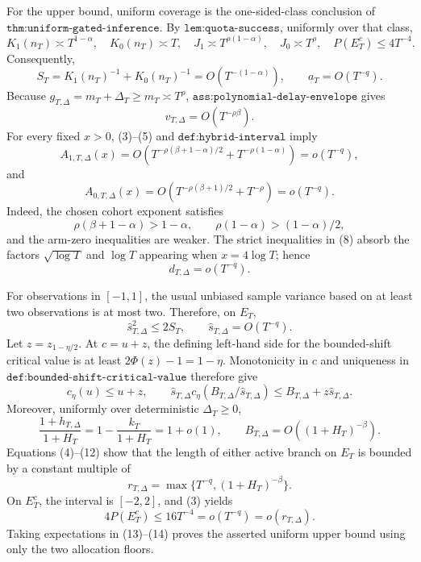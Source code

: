 For the upper bound, uniform coverage is the one-sided-class conclusion of \(\texttt{thm:uniform-gated-inference}\).  By \(\texttt{lem:quota-success}\), uniformly over that class,
\[
 K_1(n_T)\asymp T^{1-\alpha},\quad K_0(n_T)\asymp T,
 \quad J_1\asymp T^{\rho(1-\alpha)},\quad J_0\asymp T^\rho,
 \quad P(E_T^c)\leq4T^{-4}.
 \tag{3}
\]
Consequently,
\[
 S_T=K_1(n_T)^{-1}+K_0(n_T)^{-1}=O(T^{-(1-\alpha)}),
 \qquad a_T=O(T^{-q}).
 \tag{4}
\]
Because \(g_{T,\Delta}=m_T+\Delta_T\geq m_T\asymp T^\rho\), \(\texttt{ass:polynomial-delay-envelope}\) gives
\[
 v_{T,\Delta}=O(T^{-\rho\beta}).
 \tag{5}
\]
For every fixed \(x>0\), (3)--(5) and \(\texttt{def:hybrid-interval}\) imply
\[
 A_{1,T,\Delta}(x)
 =O\!\left(T^{-\rho(\beta+1-\alpha)/2}
          +T^{-\rho(1-\alpha)}\right)=o(T^{-q}),
 \tag{6}
\]
and
\[
 A_{0,T,\Delta}(x)
 =O\!\left(T^{-\rho(\beta+1)/2}+T^{-\rho}\right)=o(T^{-q}).
 \tag{7}
\]
Indeed, the chosen cohort exponent satisfies
\[
 \rho(\beta+1-\alpha)>1-\alpha,
 \qquad \rho(1-\alpha)>(1-\alpha)/2,
 \tag{8}
\]
and the arm-zero inequalities are weaker.  The strict inequalities in (8) absorb the factors \(\sqrt{\log T}\) and \(\log T\) appearing when \(x=4\log T\); hence
\[
 d_{T,\Delta}=o(T^{-q}).
 \tag{9}
\]

For observations in \([-1,1]\), the usual unbiased sample variance based on at least two observations is at most two.  Therefore, on \(E_T\),
\[
 \widehat s_{T,\Delta}^2\leq2S_T,
 \qquad \widehat s_{T,\Delta}=O(T^{-q}).
 \tag{10}
\]
Let \(z=z_{1-\eta/2}\).  At \(c=u+z\), the defining left-hand side for the bounded-shift critical value is at least
\(2\Phi(z)-1=1-\eta\).  Monotonicity in \(c\) and uniqueness in \(\texttt{def:bounded-shift-critical-value}\) therefore give
\[
 c_\eta(u)\leq u+z,
 \qquad
 \widehat s_{T,\Delta}c_\eta(B_{T,\Delta}/\widehat s_{T,\Delta})
 \leq B_{T,\Delta}+z\widehat s_{T,\Delta}.
 \tag{11}
\]
Moreover, uniformly over deterministic \(\Delta_T\geq0\),
\[
 \frac{1+h_{T,\Delta}}{1+H_T}
 =1-\frac{k_T}{1+H_T}=1+o(1),
 \qquad
 B_{T,\Delta}=O((1+H_T)^{-\beta}).
 \tag{12}
\]
Equations (4)--(12) show that the length of either active branch on \(E_T\) is bounded by a constant multiple of
\[
 r_{T,\Delta}=\max\{T^{-q},(1+H_T)^{-\beta}\}.
 \tag{13}
\]
On \(E_T^c\), the interval is \([-2,2]\), and (3) yields
\[
 4P(E_T^c)\leq16T^{-4}=o(T^{-q})=o(r_{T,\Delta}).
 \tag{14}
\]
Taking expectations in (13)--(14) proves the asserted uniform upper bound using only the two allocation floors.

